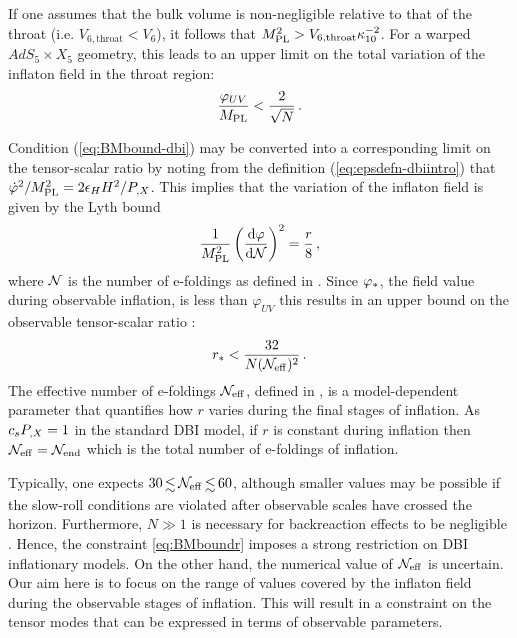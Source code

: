 If one assumes that the bulk volume is 
non-negligible relative to 
that of the throat (i.e. $V_{6,\mathrm{throat}} < V_{6}$), 
it follows that $M_{\mathrm{PL}}^2> V_{6,\mathrm{throat}}\kappa_{10}^{-2}$. 
For a warped $AdS_5 \times X_5$ geometry, this leads to an 
upper limit on the total variation of the inflaton field in 
the throat region:
% 
\begin{equation}
\label{eq:BMbound-dbi}
\frac{\varphi_{UV}}{M_{\mathrm{PL}}}   < \frac{2}{\sqrt{N}} \,.
\end{equation}
% 


Condition (\ref{eq:BMbound-dbi}) may be converted into a 
corresponding limit on the tensor-scalar ratio by noting from 
the definition (\ref{eq:epsdefn-dbiintro})
that $\dot{\varphi}^2 /M_{\mathrm{PL}}^2 = 2\epsilon_H H^2/P_{,X}$.
This implies that the variation of the inflaton field 
is given by the Lyth bound  
\cite{lyth,bmpaper}
% 
\begin{equation}
\label{eq:rtheory}
\frac{1}{M_{\mathrm{PL}}^2} \left( \frac{\mathrm{d}\varphi}{\mathrm{d} \mathcal{N}} \right)^2 =
\frac{r}{8} \,,
\end{equation}
% 
where $\mathcal{N}$ is the number of e-foldings as defined in . 
Since $\varphi_*$, the field value during observable inflation,  is
less than $\varphi_{UV}$
this results in an upper bound on the observable tensor-scalar ratio
\cite{bmpaper}: 
% 
\begin{equation}
\label{eq:BMboundr}
r_*  < \frac{32}{N (\mathcal{N}_\mathrm{eff})^2} \,.
\end{equation}
% 
The effective number of e-foldings $\mathcal{N}_\mathrm{eff}$, defined in
, 
is a model-dependent parameter that quantifies 
how $r$ varies during the final stages of inflation. As $c_sP_{,X} = 1$ in the
standard DBI model, if $r$ is constant during
inflation then $\mathcal{N}_\mathrm{eff} = \mathcal{N}_\mathrm{end}$ which is the total number of e-foldings
of inflation.


Typically, one expects $30 \, \lsim \, {\Neff} 
\, \lsim \, 60$, 
although smaller values may be possible if the slow-roll conditions are 
violated after observable scales have crossed the horizon. 
Furthermore, $N \gg 1$ is necessary 
for backreaction effects to be negligible \cite{bmpaper}. 
Hence, the constraint \eqref{eq:BMboundr} 
imposes a strong restriction on DBI inflationary models. 
On the other hand, the numerical value 
of $\mathcal{N}_\mathrm{eff}$ is uncertain.  
Our aim here is to focus on the range of values covered by the 
inflaton field during the observable stages of inflation. 
This will result in a constraint on the tensor modes that 
can be expressed in terms of observable parameters.  


